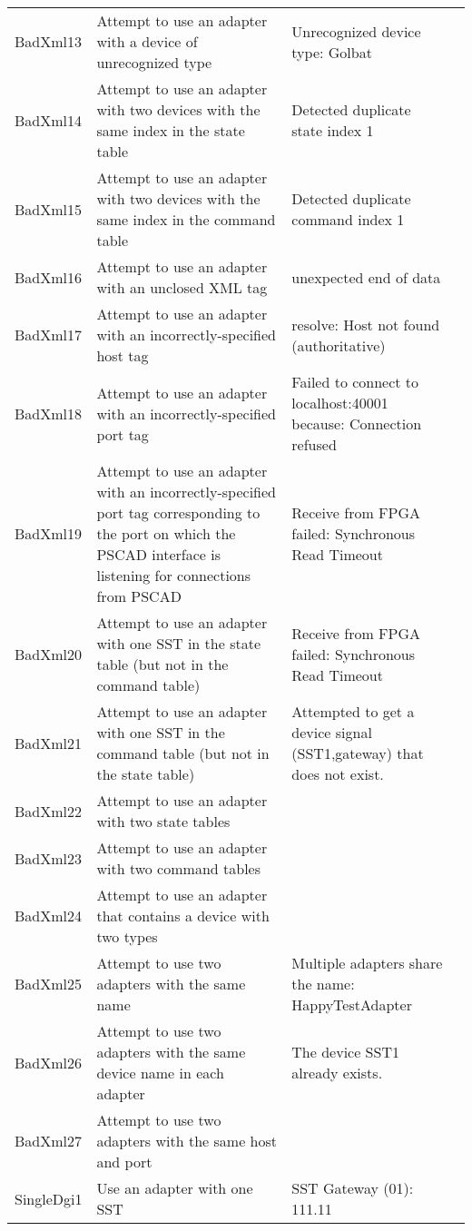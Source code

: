 \documentclass{article}
\begin{document}
\begin{center}
\begin{footnotesize}
\begin{longtable}{|p{3cm}|p{4cm}|p{10cm}|c|}
    BadXml13 & Attempt to use an adapter with a device of unrecognized type & Unrecognized device type: Golbat & \\
    BadXml14 & Attempt to use an adapter with two devices with the same index in the state table & Detected duplicate state index 1 & \\
    BadXml15 & Attempt to use an adapter with two devices with the same index in the command table & Detected duplicate command index 1 & \\
    BadXml16 & Attempt to use an adapter with an unclosed XML tag & unexpected end of data & \\
    BadXml17 & Attempt to use an adapter with an incorrectly-specified host tag & resolve: Host not found (authoritative) & \\
    BadXml18 & Attempt to use an adapter with an incorrectly-specified port tag & Failed to connect to localhost:40001 because: Connection refused & \\
    BadXml19 & Attempt to use an adapter with an incorrectly-specified port tag corresponding to the port on which the PSCAD interface is listening for connections from PSCAD & Receive from FPGA failed: Synchronous Read Timeout & \\
    BadXml20 & Attempt to use an adapter with one SST in the state table (but not in the command table) & Receive from FPGA failed: Synchronous Read Timeout & \\
    BadXml21 & Attempt to use an adapter with one SST in the command table (but not in the state table) & Attempted to get a device signal (SST1,gateway) that does not exist. & \\
    BadXml22 & Attempt to use an adapter with two state tables & & \\
    BadXml23 & Attempt to use an adapter with two command tables & & \\
    BadXml24 & Attempt to use an adapter that contains a device with two types & \\
    BadXml25 & Attempt to use two adapters with the same name & Multiple adapters share the name: HappyTestAdapter & \\
    BadXml26 & Attempt to use two adapters with the same device name in each adapter & The device SST1 already exists. & \\
    BadXml27 & Attempt to use two adapters with the same host and port & & \\
    SingleDgi1 & Use an adapter with one SST & SST Gateway (01): 111.11 & \\

\end{longtable}
\end{footnotesize}
\end{center}
\end{document}
